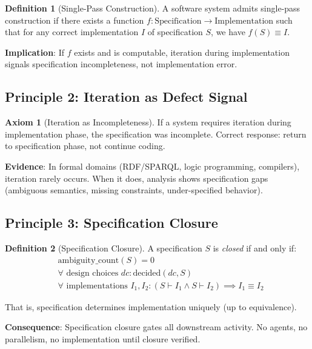 \documentclass[12pt,oneside,a4paper]{book}
\theoremstyle{definition}
\newtheorem{axiom}{Axiom}[chapter]
\newtheorem{definition}{Definition}[chapter]
\begin{document}
\begin{definition}[Single-Pass Construction]
A software system admits single-pass construction if there exists a function
$f: \text{Specification} \to \text{Implementation}$ such that for any correct
implementation $I$ of specification $S$, we have $f(S) \equiv I$.
\end{definition}

\textbf{Implication}: If $f$ exists and is computable, iteration during
implementation signals specification incompleteness, not implementation error.

\subsection{Principle 2: Iteration as Defect Signal}

\begin{axiom}[Iteration as Incompleteness]
If a system requires iteration during implementation phase, the specification
was incomplete. Correct response: return to specification phase, not continue coding.
\end{axiom}

\textbf{Evidence}: In formal domains (RDF/SPARQL, logic programming, compilers),
iteration rarely occurs. When it does, analysis shows specification gaps
(ambiguous semantics, missing constraints, under-specified behavior).

\subsection{Principle 3: Specification Closure}

\begin{definition}[Specification Closure]
A specification $S$ is \emph{closed} if and only if:
\begin{align}
  &\text{ambiguity\_count}(S) = 0 \\
  &\forall \text{ design choices } dc: \text{decided}(dc, S) \\
  &\forall \text{ implementations } I_1, I_2: (S \vdash I_1 \land S \vdash I_2) \implies I_1 \equiv I_2
\end{align}

That is, specification determines implementation uniquely (up to equivalence).
\end{definition}

\textbf{Consequence}: Specification closure gates all downstream activity.
No agents, no parallelism, no implementation until closure verified.
\end{document}
